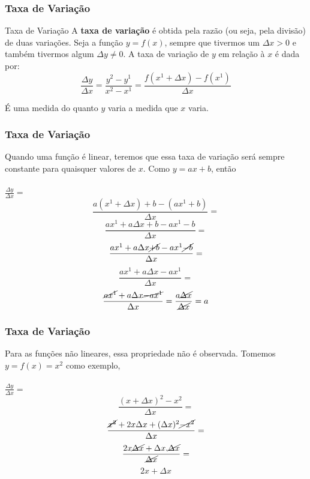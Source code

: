 \documentclass{beamer}[10]
\begin{document}
\begin{frame}
	\frametitle{Taxa de Variação}

	\begin{block}{Taxa de Variação}
		A \textbf{taxa de variação} é obtida pela razão (ou seja, pela divisão) de duas variações. Seja a função $y = f(x)$, sempre que tivermos um $\Delta x > 0$ e também tivermos algum $\Delta y \neq 0$. A taxa de variação de $y$ em relação à $x$ é dada por:
		$$ \frac{\Delta y}{\Delta x} = \frac{y^2 - y^1}{x^2 - x^1} = \frac{f(x^1 + \Delta x) - f(x^1)}{\Delta x} $$
	\end{block}

	É uma medida do quanto $y$ varia a medida que $x$ varia.
\end{frame}

\begin{frame}
	\frametitle{Taxa de Variação}
	Quando uma função é linear, teremos que essa taxa de variação será sempre constante para quaisquer valores de $x$. Como $y = ax + b$, então
	\\~\\
	\Large $ \frac{\Delta y}{\Delta x} = $ \small
	$$ \frac{a(x^1 + \Delta x) + b - (ax^1 + b)}{\Delta x} = $$
	$$ \frac{ax^1 + a\Delta x + b - ax^1 - b}{\Delta x} = $$
	$$ \frac{ax^1 + a\Delta x \cancel{+ b} - ax^1 \cancel{- b}}{\Delta x} = $$
	$$ \frac{ax^1 + a\Delta x - ax^1}{\Delta x} = $$
	$$ \frac{\cancel{ax^1} + a\Delta x \cancel{- ax^1}}{\Delta x} = \frac{a \cancel{\Delta x}}{\cancel{\Delta x}} = a $$
\end{frame}

\begin{frame}
	\frametitle{Taxa de Variação}

	Para as funções não lineares, essa propriedade não é observada. Tomemos $y = f(x) = x^2$ como exemplo,
	\\~\\
	\Large $ \frac{\Delta y}{\Delta x} = $ \normalsize
	$$ \frac{(x + \Delta x)^2 - x^2}{\Delta x} = $$ 
	$$  \frac{\cancel{x^2} + 2x \Delta x + (\Delta x)^2 \cancel{-x^2}}{\Delta x} = $$
	$$  \frac{2x \cancel{\Delta x} + \Delta x . \cancel{\Delta x}}{\cancel{\Delta x}} = $$
	$$  2x + \Delta x $$
\end{frame}
\end{document}
